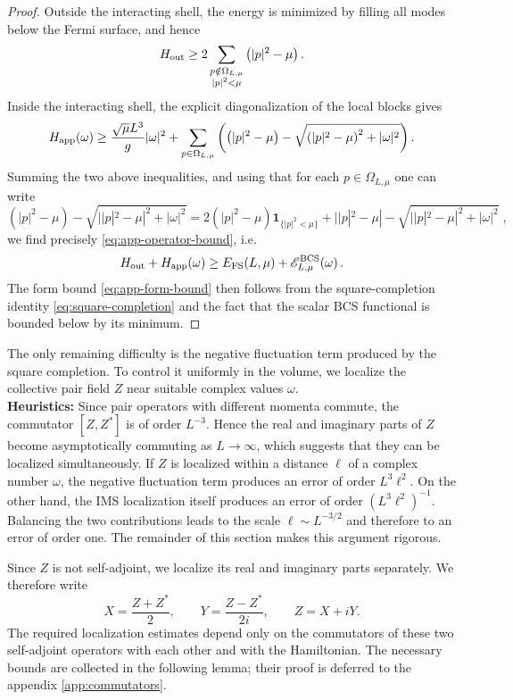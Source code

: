 \documentclass[11pt]{amsart}
\theoremstyle{definition}
\numberwithin{equation}{section}
\newcommand{\1}{\mathbf 1}
\begin{document}
\begin{proof}
Outside the interacting shell, the energy is minimized by filling all modes below the Fermi surface, and hence
\begin{equation}\label{eq:H-out-lower}
 H_{\rm out}
 \ge
 2\sum_{\substack{p\notin\Omega_{L,\mu}\\ |p|^2 < \mu}}\left(|p|^2 - \mu \right).
\end{equation}
Inside the interacting shell, the explicit diagonalization of the local blocks gives
\[
 H_{\rm app}(\omega)
 \ge
 \frac{\sqrt{\mu}L^3}{g}|\omega|^2
 +\sum_{p\in\Omega_{L,\mu}}
 \left(\left(|p|^2 - \mu \right)-\sqrt{\left(|p|^2 - \mu \right)^2+|\omega|^2}\right).
\]
Summing the two above inequalities, and using that for each $p \in \Omega_{L, \mu}$ one can write
\[
 (|p|^2 - \mu)-\sqrt{||p|^2 - \mu|^2+|\omega|^2}
 =
 2(|p|^2 - \mu)\1_{\{|p|^2<\mu\}}
 +||p|^2 - \mu|-\sqrt{||p|^2 - \mu|^2+|\omega|^2}\;,
\]
we find precisely \eqref{eq:app-operator-bound}, i.e.
\begin{equation*}
    H_{\rm out} + H_{\rm app}(\omega) \geq E_{\rm FS}(L, \mu) + \mathscr{E}_{L,\mu}^{\rm BCS}(\omega)\,.
\end{equation*}
The form bound \eqref{eq:app-form-bound} then follows from the square-completion identity \eqref{eq:square-completion} and the fact that the scalar BCS functional is bounded below by its minimum.
\end{proof}
The only remaining difficulty is the negative fluctuation term produced by the square completion. To control it uniformly in the volume, we localize the collective pair field $Z$ near suitable complex values $\omega$.\\
\textbf{Heuristics:} Since pair operators with different momenta commute, the commutator $[Z,Z^*]$ is of order $L^{-3}$. Hence the real and imaginary parts of $Z$ become asymptotically commuting as $L\to\infty$, which suggests that they can be localized simultaneously. If $Z$ is localized within a distance $\ell$ of a complex number $\omega$, the negative fluctuation term produces an error of order $L^3\ell^2$. On the other hand, the IMS localization itself produces an error of order $(L^3\ell^2)^{-1}$. Balancing the two contributions leads to the scale $\ell\sim L^{-3/2}$ and therefore to an error of order one. The remainder of this section makes this argument rigorous.


Since $Z$ is not self-adjoint, we localize its real and imaginary parts separately. We therefore write
\begin{equation}\label{eq:XY}
 X=\frac{Z+Z^*}{2},\qquad
 Y=\frac{Z-Z^*}{2i},\qquad Z=X+iY.
\end{equation}
 The required localization estimates depend only on the commutators of these two self-adjoint operators with each other and with the Hamiltonian. The necessary bounds are collected in the following lemma; their proof is deferred to the appendix \ref{app:commutators}.
\end{document}
